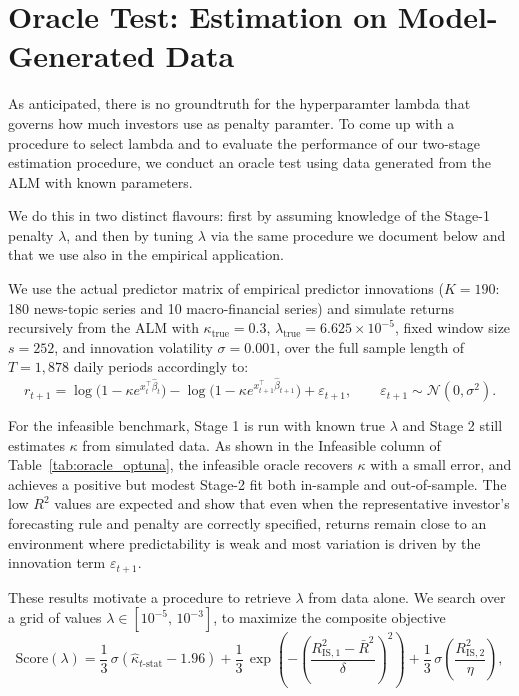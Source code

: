 \section{Oracle Test: Estimation on Model-Generated Data}\label{app:oracle}

As anticipated, there is no groundtruth for the hyperparamter lambda that governs how much investors use as penalty paramter.
To come up with a procedure to select lambda and to evaluate the performance of our two-stage estimation procedure, we conduct an oracle test using data generated from the ALM with known parameters.

We do this in two distinct flavours: first by assuming knowledge of the Stage-1 penalty $\lambda$, and then by tuning $\lambda$ via the same procedure we document below and that we use also in the empirical application.

We use the actual predictor matrix of empirical predictor innovations ($K=190$: 180 news-topic series and 10 macro-financial series) and simulate returns recursively from the ALM with
$\kappa_{\text{true}}=0.3$, $\lambda_{\text{true}}=6.625\times 10^{-5}$,
fixed window size $s=252$, and innovation volatility $\sigma=0.001$, over the full sample length of  $T=1{,}878$ daily periods accordingly to:
\[
r_{t+1}
= \log\!\bigl(1-\kappa e^{x_t^\top\hat\beta_t}\bigr)
- \log\!\bigl(1-\kappa e^{x_{t+1}^\top\hat\beta_{t+1}}\bigr)
+ \varepsilon_{t+1},
\qquad
\varepsilon_{t+1}\sim \mathcal{N}(0,\sigma^2).
\]



For the infeasible benchmark, Stage 1 is run with known true $\lambda$ and Stage 2 still
estimates $\kappa$ from simulated data.
As shown in the Infeasible column of Table~\ref{tab:oracle_optuna}, the infeasible oracle recovers $\kappa$ with a small error, and achieves a positive but modest Stage-2 fit both in-sample and out-of-sample.
The low $R^2$ values are expected and show that even when the representative investor's forecasting rule and penalty are correctly specified, returns remain close to an environment where predictability is weak and most variation is driven by the innovation term $\varepsilon_{t+1}$.

These results motivate a procedure to retrieve $\lambda$ from data alone. We search over a grid of values $\lambda \in [10^{-5},\,10^{-3}]$, 
to maximize the composite objective
\begin{equation}\label{eq:oracle_optuna_obj}
\text{Score}(\lambda)
= \frac{1}{3}\,\sigma\!\left(\hat\kappa_{t\text{-stat}} - 1.96\right)
+ \frac{1}{3}\,\exp\!\left(-\!\left(\frac{R^2_{\text{IS},1} - \bar R^2}{\delta}\right)^{\!2}\right)
+ \frac{1}{3}\,\sigma\!\left(\frac{R^2_{\text{IS},2}}{\eta}\right),
\end{equation}

